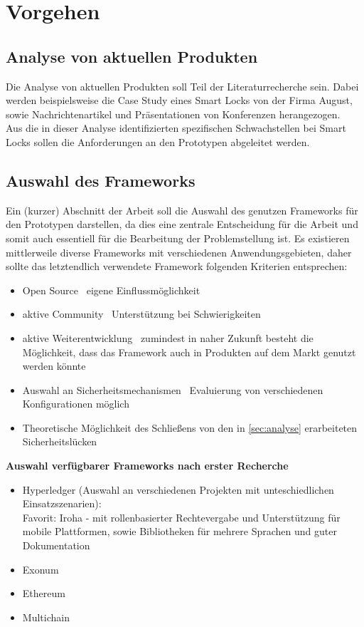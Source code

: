 \section*{Vorgehen}
    \subsection*{Analyse von aktuellen Produkten}
        Die Analyse von aktuellen Produkten soll Teil der Literaturrecherche sein. 
        Dabei werden beispielsweise die Case Study eines Smart Locks von der Firma August\cite{Ye2017}, sowie Nachrichtenartikel\cite{Tsing2017} und Präsentationen von Konferenzen\cite{Rose2016} herangezogen.\\
        \noindent Aus die in dieser Analyse identifizierten spezifischen Schwachstellen bei Smart Locks sollen die Anforderungen an den Prototypen abgeleitet werden.
    
    \subsection*{Auswahl des Frameworks}
        Ein (kurzer) Abschnitt der Arbeit soll die Auswahl des genutzen Frameworks für den Prototypen darstellen, da dies eine zentrale Entscheidung für die Arbeit und somit auch essentiell für die Bearbeitung der Problemstellung ist.
        Es existieren mittlerweile diverse Frameworks mit verschiedenen Anwendungsgebieten, daher sollte das letztendlich verwendete Framework folgenden Kriterien entsprechen:
        \begin{itemize}
            \item Open Source \textrightarrow\ eigene Einflussmöglichkeit
            \item aktive Community \textrightarrow\ Unterstützung bei Schwierigkeiten
            \item aktive Weiterentwicklung \textrightarrow\ zumindest in naher Zukunft besteht die Möglichkeit, dass das Framework auch in Produkten auf dem Markt genutzt werden könnte
            \item Auswahl an Sicherheitsmechanismen \textrightarrow\ Evaluierung von verschiedenen Konfigurationen möglich
            \item Theoretische Möglichkeit des Schließens von den in \ref{sec:analyse} erarbeiteten Sicherheitslücken
        \end{itemize}
        \medskip
        \textbf{Auswahl verfügbarer Frameworks nach erster Recherche}
        \begin{itemize}
            \item Hyperledger (Auswahl an verschiedenen Projekten mit unteschiedlichen Einsatzszenarien):\\
                Favorit: Iroha - mit rollenbasierter Rechtevergabe und Unterstützung für mobile Plattformen, sowie Bibliotheken für mehrere Sprachen und guter Dokumentation
            \item Exonum
            \item Ethereum
            \item Multichain
        \end{itemize}
    
